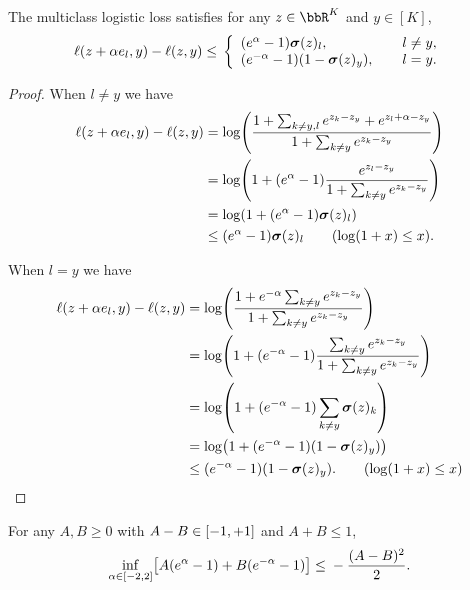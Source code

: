 \begin{lemma}\label{lem:logistic_ub}
The multiclass logistic loss satisfies for any $z \in \bbR^K$ and $y\in [K]$,
\[
\ls(z + \alpha{}e_{l}, y) - \ls(z,y)
\leq{} \left\{
\begin{array}{ll}
(e^{\alpha}-1)\mb{\sigma}(z)_{l},\quad &l \neq{}y,\\
(e^{-\alpha}-1)(1-\mb{\sigma}(z)_{y}),\quad{} &l=y.
\end{array}
\right.
\]
\end{lemma}
\begin{proof}
When $l\neq{}y$ we have
\begin{align*}
\ls(z + \alpha{}e_{l}, y) - \ls(z,y) &= \log\prn*{
\frac{1+\sum_{k\neq{}y, l}e^{z_k - z_y} + e^{z_l + \alpha - z_y} }
{1+\sum_{k\neq{}y}e^{z_k - z_y}}
} \\
&= \log\prn*{
1 + (e^{\alpha}-1)\frac{e^{z_l-z_y}}{1+\sum_{k\neq{}y}e^{z_k-z_y}}
} \\
&= \log\prn*{
1 + (e^{\alpha}-1)\mb{\sigma}(z)_{l}
} \\
&\leq{} (e^{\alpha}-1)\mb{\sigma}(z)_{l} \tag{$\log(1+x)\leq{}x$}.
\end{align*}

When $l=y$ we have
\begin{align*}
\ls(z + \alpha{}e_{l}, y) - \ls(z,y) &= \log\prn*{
\frac{1+e^{-\alpha}\sum_{k\neq{}y}e^{z_k - z_y}}
{1+\sum_{k\neq{}y}e^{z_k - z_y}}
} \\
&= \log\prn*{
1+(e^{-\alpha}-1)\frac{\sum_{k\neq{}y}e^{z_k - z_y}}{1 + \sum_{k\neq{}y}e^{z_k - z_y}}
} \\
&= \log\prn*{
1 + (e^{-\alpha}-1)\sum_{k\neq{}y}\mb{\sigma}(z)_{k}
} \\
&= \log\prn*{
1 + (e^{-\alpha}-1)(1-\mb{\sigma}(z)_{y})
} \\
&\leq{} (e^{-\alpha}-1)(1-\mb{\sigma}(z)_{y}). \tag{$\log(1+x)\leq{}x$}
\end{align*}
\end{proof}

\begin{lemma}
\label{lem:logistic_inf}
For any $A,B\geq{}0$ with $A-B\in\brk*{-1, +1}$ and $A+B\leq{}1$,
\[
\inf_{\alpha\in\brk*{-2,2}}\brk*{A(e^{\alpha}-1) + B(e^{-\alpha}-1)} \leq{} -\frac{(A-B)^{2}}{2}.
\]
\end{lemma}



